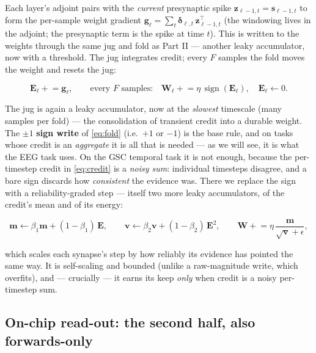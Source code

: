 \documentclass[11pt]{article}
\begin{document}
Each layer's adjoint pairs with the \emph{current} presynaptic spike
\(\bm z_{\ell-1,t}=\bm s_{\ell-1,t}\) to form the per-sample weight
gradient
\(\bm g_\ell = \sum_t \bm\delta_{\ell,t}\,\bm z_{\ell-1,t}^{\!\top}\)
(the windowing lives in the adjoint; the presynaptic term is the spike
at time \(t\)). This is written to the weights through the same jug and
fold as Part II --- another leaky accumulator, now with a threshold. The
jug integrates credit; every \(F\) samples the fold moves the weight and
resets the jug:

\begin{equation}
\bm E_\ell \mathrel{+}= \bm g_\ell, \qquad
\text{every $F$ samples:}\quad \bm W_\ell \mathrel{+}= \eta\,\operatorname{sign}(\bm E_\ell),\quad \bm E_\ell \leftarrow 0 .
\label{eq:fold}
\end{equation}

The jug is again a leaky accumulator, now at the \emph{slowest}
timescale (many samples per fold) --- the consolidation of transient
credit into a durable weight. The \(\pm1\) \textbf{sign write} of
\eqref{eq:fold} (i.e.~\(+1\) or \(-1\)) is the base rule, and on tasks
whose credit is an \emph{aggregate} it is all that is needed --- as we
will see, it is what the EEG task uses. On the GSC temporal task it is
not enough, because the per-timestep credit in \eqref{eq:credit} is a
\emph{noisy sum}: individual timesteps disagree, and a bare sign
discards how \emph{consistent} the evidence was. There we replace the
sign with a reliability-graded step --- itself two more leaky
accumulators, of the credit's mean and of its energy:

\begin{equation}
\bm m \leftarrow \beta_1 \bm m + (1-\beta_1)\,\bm E, \qquad
\bm v \leftarrow \beta_2 \bm v + (1-\beta_2)\,\bm E^{2}, \qquad
\bm W \mathrel{+}= \eta\,\frac{\bm m}{\sqrt{\bm v}+\epsilon},
\label{eq:varnorm}
\end{equation}

which scales each synapse's step by how reliably its evidence has
pointed the same way. It is self-scaling and bounded (unlike a
raw-magnitude write, which overfits), and --- crucially --- it earns its
keep \emph{only} when credit is a noisy per-timestep sum.

\hypertarget{sec:readout}{%
\subsection{On-chip read-out: the second half, also
forwards-only}\label{sec:readout}}
\end{document}
